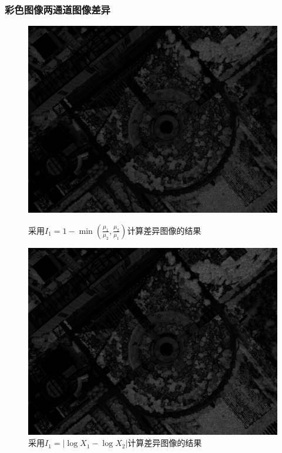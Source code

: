 \subsubsection{彩色图像两通道图像差异}
\begin{figure}[H]
	\centering
	\begin{minipage}{0.45\linewidth}
		\includegraphics[width=\linewidth]{figure/DJI_0027_Minus_Differ.png}
		\caption{采用$I_1=1-\min\left(\frac{\mu_1}{\mu_2},\frac{\mu_2}{\mu_1} \right) $计算差异图像的结果}
	\end{minipage}
	\begin{minipage}{0.45\linewidth}
		\includegraphics[width=\linewidth]{figure/DJI_0027_Log_Differ.png}
		\caption{采用$I_1=\left|\log X_1-\log X_2 \right| $计算差异图像的结果}
	\end{minipage}
\end{figure}
